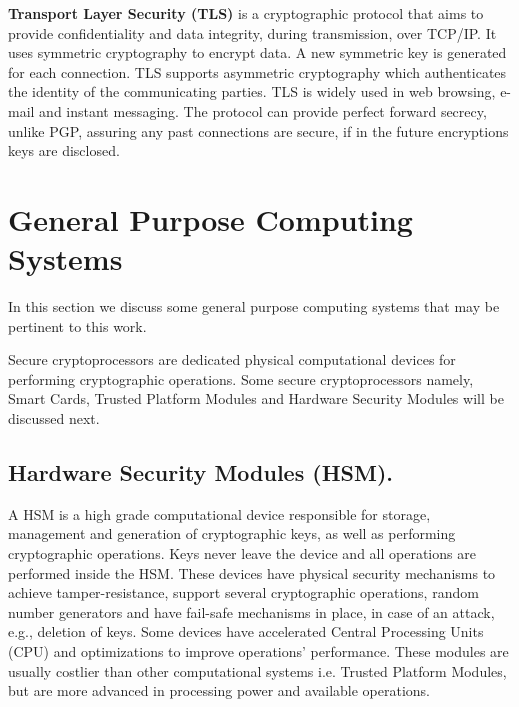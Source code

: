 \textbf{Transport Layer Security (TLS)} is a cryptographic protocol that aims to provide confidentiality and data integrity, during transmission, over TCP/IP. It uses symmetric cryptography to encrypt data. A new symmetric key is generated for each connection.
TLS supports asymmetric cryptography which authenticates the identity of the communicating parties.
TLS is widely used in web browsing, e-mail and instant messaging.
The protocol can provide perfect forward secrecy, unlike PGP, assuring any past connections are secure, if in the future encryptions keys are disclosed.


\section{General Purpose Computing Systems} \label{chap:background:computing}

In this section we discuss some general purpose computing systems that may be pertinent to this work. 

Secure cryptoprocessors are dedicated physical computational devices for performing cryptographic operations. Some secure cryptoprocessors namely, Smart Cards, Trusted Platform Modules and Hardware Security Modules will be discussed next.

\subsection{Hardware Security Modules (HSM).} \label{chap:background:computing:hsm}

A HSM is a high grade computational device responsible for storage, management and generation of cryptographic keys, as well as performing cryptographic operations. Keys never leave the device and all operations are performed inside the HSM. These devices have physical security mechanisms to achieve tamper-resistance, support several cryptographic operations, random number generators and have fail-safe mechanisms in place, in case of an attack, e.g., deletion of keys. Some devices have accelerated Central Processing Units (CPU) and optimizations to improve operations' performance.
These modules are usually costlier than other computational systems i.e. Trusted Platform Modules, but are more advanced in processing power and available operations.

